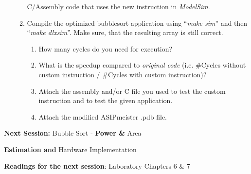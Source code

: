 \begin{enumerate}
\begin{enumerate}
		C/Assembly code that uses the new instruction in \emph{ModelSim}.
		\item
		Compile the optimized bubblesort application using ``\emph{make
			sim}'' and then ``\emph{make dlxsim}''. Make sure, that the
		resulting array is still correct.
		\begin{enumerate}[label=(\alph*),start=4]
			\color{red}\item\normalcolor
			How many cycles do you need for execution?
			\color{red}\item\normalcolor
			What is the speedup compared to \emph{original code} (i.e. \#Cycles
			without custom instruction / \#Cycles with custom instruction)?
			\color{red}\item\normalcolor
			Attach the assembly and/or C file you used to test the custom
			instruction and to test the given application.
			\color{red}\item\normalcolor
			Attach the modified ASIPmeister .pdb file.
		\end{enumerate}
	\end{enumerate}
\end{enumerate}

\textbf{Next Session:} Bubble Sort - \textbf{Power \&} Area

\textbf{Estimation and} Hardware Implementation

\textbf{Readings for the next session}: Laboratory Chapters 6 \& 7
